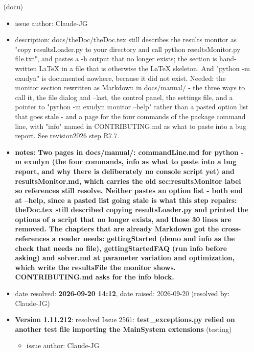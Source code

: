 \begin{itemize}
\begin{itemize}
\begin{itemize}
\begin{itemize}
\begin{itemize}
\begin{itemize}
\begin{itemize}
\begin{itemize}
(docu)
\vspace{-6pt}   \begin{itemize} \setlength\itemsep{-1pt}
    \item issue author: Claude-JG
    \item {description: docs/theDoc/theDoc.tex still describes the results monitor as "copy resultsLoader.py to your directory and call python resultsMonitor.py file.txt", and pastes a -h output that no longer exists; the section is hand-written LaTeX in a file that is otherwise the LaTeX skeleton. And "python -m exudyn" is documented nowhere, because it did not exist. Needed: the monitor section rewritten as Markdown in docs/manual/ - the three ways to call it, the file dialog and --last, the control panel, the settings file, and a pointer to "python -m exudyn monitor --help" rather than a pasted option list that goes stale - and a page for the four commands of the package command line, with "info" named in CONTRIBUTING.md as what to paste into a bug report. See revision2026 step R7.7.}
    \item {\bf notes: Two pages in docs/manual/: commandLine.md for python -m exudyn (the four commands, info as what to paste into a bug report, and why there is deliberately no console script yet) and resultsMonitor.md, which carries the old sec:resultsMonitor label so references still resolve. Neither pastes an option list - both end at --help, since a pasted list going stale is what this step repairs: theDoc.tex still described copying resultsLoader.py and printed the options of a script that no longer exists, and those 30 lines are removed. The chapters that are already Markdown got the cross-references a reader needs: gettingStarted (demo and info as the check that needs no file), gettingStartedFAQ (run info before asking) and solver.md at parameter variation and optimization, which write the resultsFile the monitor shows. CONTRIBUTING.md asks for the info block.}
    \item   date resolved: {\bf 2026-09-20 14:12},
date raised: 2026-09-20 (resolved by: Claude-JG)
  \ei
  \item[] {\bf Version 1.11.212}:  resolved Issue 2561: {\bf test\_exceptions.py relied on another test file importing the MainSystem extensions}
(testing)
\vspace{-6pt}   \begin{itemize} \setlength\itemsep{-1pt}
    \item issue author: Claude-JG

\end{itemize}
\end{itemize}
\end{itemize}
\end{itemize}
\end{itemize}
\end{itemize}
\end{itemize}
\end{itemize}
\end{itemize}
\end{itemize}
